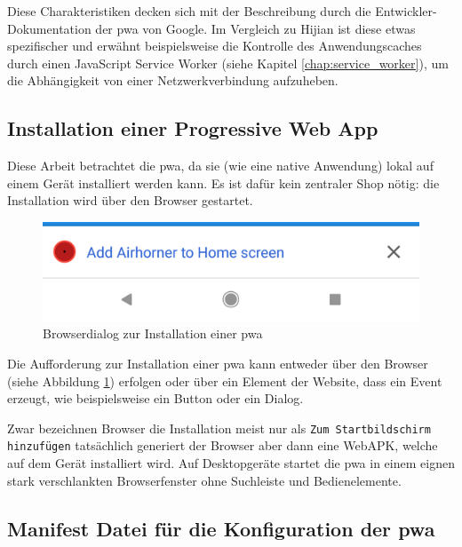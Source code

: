 \cite[S. 1f.]{Hajian2019}
Diese Charakteristiken decken sich mit der Beschreibung durch die Entwickler-Dokumentation der \ac{pwa} von Google. Im Vergleich zu Hijian ist diese etwas spezifischer und erwähnt beispielsweise die Kontrolle des Anwendungscaches durch einen JavaScript Service Worker (siehe Kapitel \ref{chap:service_worker}), um die Abhängigkeit von einer Netzwerkverbindung aufzuheben.
\cite{GooglePWAOverview}

\subsection{Installation einer Progressive Web App}

Diese Arbeit betrachtet die \ac{pwa}, da sie (wie eine native Anwendung) lokal auf einem Gerät installiert werden kann. Es ist dafür kein zentraler Shop nötig: die Installation wird über den Browser gestartet.

\begin{figure}[h]
        \centering
        \includegraphics[scale=0.2]{img/a2hs-infobar-cropped.png}
        \caption{Browserdialog zur Installation einer \ac{pwa} \cite{PWAAddToHomeScreenPrompt}}
        \label{fig:pwainstallationprompt}
\end{figure}

Die Aufforderung zur Installation einer \ac{pwa} kann entweder über den Browser (siehe Abbildung \ref{fig:pwainstallationprompt}) erfolgen oder über ein Element der Website, dass ein Event erzeugt, wie beispielsweise ein Button oder ein Dialog. 

Zwar bezeichnen Browser die Installation meist nur als \texttt{Zum Startbildschirm hinzufügen} tatsächlich generiert der Browser aber dann eine WebAPK, welche auf dem Gerät installiert wird. Auf Desktopgeräte startet die \ac{pwa} in einem eignen stark verschlankten Browserfenster ohne Suchleiste und Bedienelemente. \cite{GooglePWAInstallation}


\subsection{Manifest Datei für die Konfiguration der \ac{pwa}}

